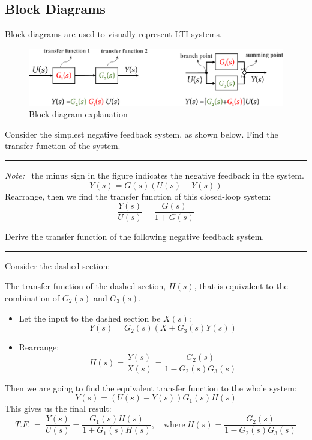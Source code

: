 \subsection{Block Diagrams}
Block diagrams are used to visually represent LTI systems.
\begin{figure}[H] 
    \centering
    \includegraphics[width=.9\textwidth]{images/block_diagram.eps}
    \caption{Block diagram explanation}
\end{figure}

\begin{ex}{}
Consider the simplest negative feedback system, as shown below. Find the transfer function of the system.
\begin{figure}[H] 
    \centering
    
\end{figure}
\hrule \vspace{.3cm} 
\textit{Note:} \  the minus sign in the figure indicates the negative feedback in the system.
\[ Y(s) = G(s)(U(s)-Y(s))\]
Rearrange, then we find the transfer function of this closed-loop system:
\[\boxed{\frac{Y(s)}{U(s)} = \frac{G(s)}{1+G(s)}}\]
\end{ex}
\begin{ex}{} 
Derive the transfer function of the following negative feedback system.
\begin{figure}[H] 
    \centering
    
\end{figure}
\hrule \vspace{.3cm} 
Consider the dashed section: 
\begin{figure}[H] 
    \centering
    
\end{figure}
The transfer function of the dashed section, $H(s)$, that is equivalent to the combination of $G_{2}(s)$ and $G_{3}(s)$.
\begin{itemize}
    \item Let the input to the dashed section be $X(s)$:
        \[Y(s) = G_{2}(s)(X+G_{3}(s)Y(s))\]
    \item Rearrange:
        \[
        H(s) = \frac{Y(s)}{X(s)} = \frac{G_{2}(s)}{1-G_{2}(s)G_{3}(s)}
        \]
\end{itemize}
Then we are going to find the equivalent transfer function to the whole system:
\[Y(s) =(U(s)-Y(s))G_{1}(s)H(s)\]
This gives us the final result:
\[
T.F. \ = \ 
\frac{Y(s)}{U(s)} = 
\frac{G_{1}(s)H(s)}{1+G_{1}(s)H(s)}, \quad \text{where} \ 
H(s) = \frac{G_{2}(s)}{1-G_{2}(s)G_{3}(s)}
\]
\end{ex}

